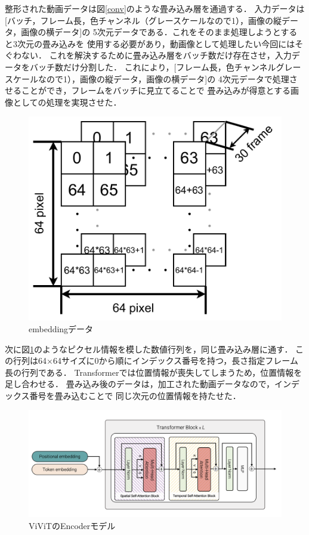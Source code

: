 整形された動画データは図\ref{conv}のような畳み込み層を通過する．
入力データは[バッチ，フレーム長，色チャンネル（グレースケールなので1），画像の縦データ，画像の横データ]の
5次元データである．これをそのまま処理しようとすると3次元の畳み込みを
使用する必要があり，動画像として処理したい今回にはそぐわない．
これを解決するために畳み込み層をバッチ数だけ存在させ，入力データをバッチ数だけ分割した．
これにより，[フレーム長，色チャンネルグレースケールなので1），画像の縦データ，画像の横データ]の
4次元データで処理させることができ，フレームをバッチに見立てることで
畳み込みが得意とする画像としての処理を実現させた．
\clearpage

\begin{figure}[t]
  \begin{center}
    \includegraphics[width=120mm]{images/chart/embedding.pdf}
  \end{center}
  \caption{embeddingデータ}
  \label{embedding}
\end{figure}

次に図\ref{embedding}のようなピクセル情報を模した数値行列を，同じ畳み込み層に通す．
この行列は64×64サイズに0から順にインデックス番号を持つ，長さ指定フレーム長の行列である．
Transformerでは位置情報が喪失してしまうため，位置情報を足し合わせる．
畳み込み後のデータは，加工された動画データなので，インデックス番号を畳み込むことで
同じ次元の位置情報を持たせた．
\clearpage

\begin{figure}[t]
  \begin{center}
    \includegraphics[width=130mm]{images/quote/encoder.png}
  \end{center}
  \caption{ViViTのEncoderモデル}
  \label{encoder}
\end{figure}

